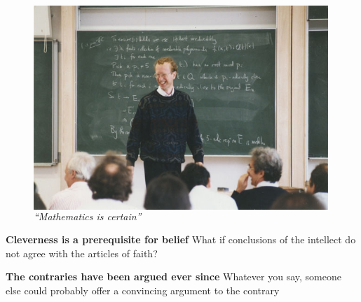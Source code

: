 \documentclass[xcolor=dvipsnames]{beamer}
\begin{document}
\begin{frame}[plain]
\begin{figure}
  \centering
  \begin{columns}
    \centering
    \includegraphics[width=0.99\textwidth,trim=0 0 0 0, clip]{fermats-theorem}
    \caption {\emph{``Mathematics is certain''}}
  \end{columns}
\end{figure}
\end{frame}


\begin{frame}[plain]
\textbf{Cleverness is a prerequisite for belief}\newline
What if conclusions of the intellect do not agree with the articles of faith? \vspace{10mm}

\textbf{The contraries have been argued ever since}\newline
Whatever you say, someone else could probably offer a convincing argument to the contrary \vspace{10mm}
\end{frame}
\end{document}
